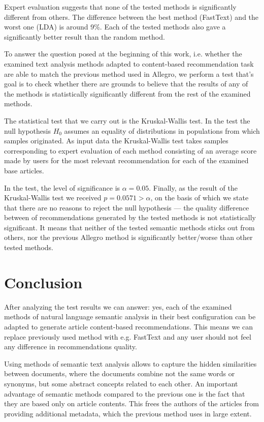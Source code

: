 \documentclass[twoside,twocolumn]{article}
\begin{document}
	Expert evaluation suggests that none of the tested methods is significantly different from others. The difference between the best method (FastText) and the worst one (LDA) is around 9\%. Each of the tested methods also gave a significantly better result than the random method.
	
	
	To answer the question posed at the beginning of this work, i.e. whether the examined text analysis methods adapted to content-based recommendation task are able to match the previous method used in Allegro, we perform a test that's goal is to check whether there are grounds to believe that the results of any of the methods is statistically significantly different from the rest of the examined methods.
		
		
	The statistical test that we carry out is the Kruskal-Wallis test. In the test the null hypothesis $H_0$ assumes an equality of distributions in populations from which samples originated.	As input data the Kruskal-Wallis test takes samples corresponding to expert evaluation of each method consisting of an average score made by users for the most relevant recommendation for each of the examined base articles.


	In the test, the level of significance is $\alpha = 0.05$. Finally, as the result of the Kruskal-Wallis test we received $p = 0.0571>\alpha$, on the basis of which we state that there are no reasons to reject the null hypothesis --- the quality difference between of recommendations generated by the tested methods is not statistically significant. It means that neither of the tested semantic methods sticks out from others, nor the previous Allegro method is significantly better/worse than other tested methods.
	
	\section{Conclusion}
	
	After analyzing the test results we can answer: yes, each of the examined methods of natural language semantic analysis in their best configuration can be adapted to generate article content-based recommendations. This means we can replace previously used method with e.g. FastText and any user should not feel any difference in recommendations quality.
	
	Using methods of semantic text analysis allows to capture the hidden similarities between documents, where the documents combine not the same words or synonyms, but some abstract concepts related to each other. An important advantage of semantic methods compared to the previous one is the fact that they are based only on article contents. This frees the authors of the articles from providing additional metadata, which the previous method uses in large extent.
	
\end{document}
